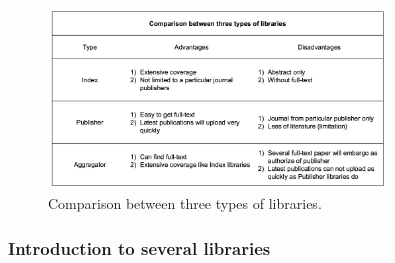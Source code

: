 \begin{figure}[htb]
	\begin{center}
		\includegraphics[width=0.8\textwidth]{Wolverine_Background_Chart_1}
	\end{center}
	\caption{Comparison between three types of libraries.\label{WBC1}}
\end{figure}
\newpage

\subsubsection{Introduction to several libraries }

